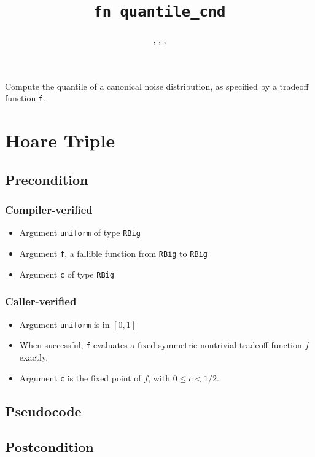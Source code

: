 \documentclass{article}
\title{\texttt{fn quantile\_cnd}}
\author{\AishwaryaRamasethuAuthor, \YuJuKuAuthor, \JordanAwanAuthor, \MichaelShoemateAuthor}
\begin{document}
\maketitle
\contrib

Compute the quantile of a canonical noise distribution, as specified by a tradeoff function \texttt{f}.

\section{Hoare Triple}

\subsection*{Precondition}
\subsubsection*{Compiler-verified}
\begin{itemize}
    \item Argument \texttt{uniform} of type \texttt{RBig}
    \item Argument \texttt{f}, a fallible function from \texttt{RBig} to \texttt{RBig}
    \item Argument \texttt{c} of type \texttt{RBig}
\end{itemize}

\subsubsection*{Caller-verified}
\begin{itemize}
    \item Argument \texttt{uniform} is in $[0, 1]$
    \item When successful, \texttt{f} evaluates a fixed symmetric nontrivial tradeoff function $f$ exactly.
    \item Argument \texttt{c} is the fixed point of $f$, with $0\leq c<1/2$.
\end{itemize}

\subsection*{Pseudocode}



\subsection*{Postcondition}
\end{document}
